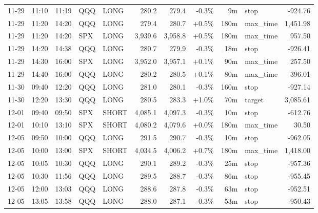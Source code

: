 \documentclass[11pt,a4paper,twoside]{article}
\begin{document}
\begin{center}
\begin{longtable}{>{\color{txtmain}}l l l l l r r r r >{\color{txtmain}}l r}
11-29 & 11:10 & 11:19 & QQQ & LONG & 280.2 & 279.4 & \textcolor{lossred}{-0.3\%} & 9m & stop & \textcolor{lossred}{-924.76} \\
11-29 & 11:20 & 14:20 & QQQ & LONG & 279.4 & 280.7 & \textcolor{wingreen}{+0.5\%} & 180m & max\_time & \textcolor{wingreen}{1,451.98} \\
11-29 & 11:20 & 14:20 & SPX & LONG & 3,939.6 & 3,958.8 & \textcolor{wingreen}{+0.5\%} & 180m & max\_time & \textcolor{wingreen}{957.50} \\
11-29 & 14:20 & 14:38 & QQQ & LONG & 280.7 & 279.9 & \textcolor{lossred}{-0.3\%} & 18m & stop & \textcolor{lossred}{-926.41} \\
11-29 & 14:30 & 16:00 & SPX & LONG & 3,952.0 & 3,957.1 & \textcolor{wingreen}{+0.1\%} & 90m & max\_time & \textcolor{wingreen}{257.50} \\
11-29 & 14:40 & 16:00 & QQQ & LONG & 280.2 & 280.5 & \textcolor{wingreen}{+0.1\%} & 80m & max\_time & \textcolor{wingreen}{396.01} \\
11-30 & 09:40 & 12:20 & QQQ & LONG & 281.0 & 280.1 & \textcolor{lossred}{-0.3\%} & 160m & stop & \textcolor{lossred}{-927.14} \\
11-30 & 12:20 & 13:30 & QQQ & LONG & 280.5 & 283.3 & \textcolor{wingreen}{+1.0\%} & 70m & target & \textcolor{wingreen}{3,085.61} \\
12-01 & 09:40 & 09:50 & SPX & SHORT & 4,085.1 & 4,097.3 & \textcolor{lossred}{-0.3\%} & 10m & stop & \textcolor{lossred}{-612.76} \\
12-01 & 10:10 & 13:10 & SPX & SHORT & 4,080.2 & 4,079.6 & \textcolor{wingreen}{+0.0\%} & 180m & max\_time & \textcolor{wingreen}{30.50} \\
12-05 & 09:50 & 10:00 & QQQ & LONG & 291.5 & 290.7 & \textcolor{lossred}{-0.3\%} & 10m & stop & \textcolor{lossred}{-962.05} \\
12-05 & 10:00 & 13:00 & SPX & SHORT & 4,034.5 & 4,006.2 & \textcolor{wingreen}{+0.7\%} & 180m & max\_time & \textcolor{wingreen}{1,418.00} \\
12-05 & 10:05 & 10:30 & QQQ & LONG & 290.1 & 289.2 & \textcolor{lossred}{-0.3\%} & 25m & stop & \textcolor{lossred}{-957.36} \\
12-05 & 10:30 & 11:56 & QQQ & LONG & 289.5 & 288.7 & \textcolor{lossred}{-0.3\%} & 86m & stop & \textcolor{lossred}{-955.45} \\
12-05 & 12:00 & 13:03 & QQQ & LONG & 288.6 & 287.8 & \textcolor{lossred}{-0.3\%} & 63m & stop & \textcolor{lossred}{-952.51} \\
12-05 & 13:05 & 13:58 & QQQ & LONG & 288.0 & 287.1 & \textcolor{lossred}{-0.3\%} & 53m & stop & \textcolor{lossred}{-950.43} \\

\end{longtable}
\end{center}
\end{document}
